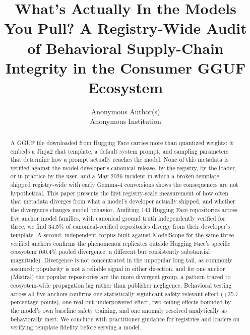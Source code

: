 \documentclass[letterpaper,twocolumn,10pt]{article}
\begin{document}
\date{}

\title{\Large \bf What's Actually In the Models You Pull? A Registry-Wide Audit of Behavioral Supply-Chain Integrity in the Consumer GGUF Ecosystem}

\author{
{\rm Anonymous Author(s)}\\
Anonymous Institution
}

\maketitle

\begin{abstract}
A GGUF file downloaded from Hugging Face carries more than quantized weights: it embeds a Jinja2 chat template, a default system prompt, and sampling parameters that determine how a prompt actually reaches the model. None of this metadata is verified against the model developer's canonical release, by the registry, by the loader, or in practice by the user, and a May 2026 incident in which a broken template shipped registry-wide with early Gemma-4 conversions shows the consequences are not hypothetical. This paper presents the first registry-scale measurement of how often that metadata diverges from what a model's developer actually shipped, and whether the divergence changes model behavior. Auditing 143 Hugging Face repositories across five anchor model families, with canonical ground truth independently verified for three, we find 34.5\% of canonical-verified repositories diverge from their developer's template. A second, independent corpus built against ModelScope for the same three verified anchors confirms the phenomenon replicates outside Hugging Face's specific ecosystem (60.4\% pooled divergence, a different but consistently substantial magnitude). Divergence is not concentrated in the unpopular long tail, as commonly assumed; popularity is not a reliable signal in either direction, and for one anchor (Mistral) the popular repositories are the more divergent group, a pattern traced to ecosystem-wide propagation lag rather than publisher negligence. Behavioral testing across all five anchors confirms one statistically significant safety-relevant effect (+35.7 percentage points), one real but underpowered effect, two ceiling effects bounded by the model's own baseline safety training, and one anomaly resolved analytically as behaviorally inert. We conclude with practitioner guidance for registries and loaders on verifying template fidelity before serving a model.
\end{abstract}
\end{document}
